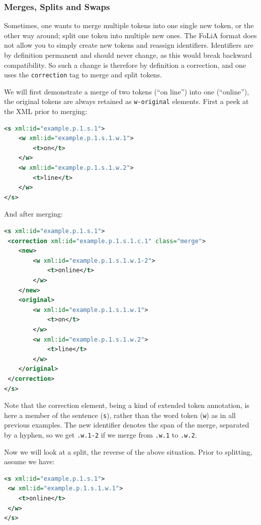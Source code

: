 \documentclass[a4paper,12pt]{report}
\begin{document}
\subsubsection{Merges, Splits and Swaps} 

Sometimes, one wants to merge multiple tokens into one single new token, or the other way around; split one token into multiple new ones. The FoLiA format does not allow you to simply create new tokens and reassign identifiers. Identifiers are by definition permanent and should never change, as this would break backward compatibility. So such a change is therefore by definition a correction, and one uses the \texttt{correction} tag to merge and split tokens.

We will first demonstrate a merge of two tokens (``on line'') into one (``online''), the original tokens are always retained as \texttt{w-original} elements. First a peek at the XML prior to merging:

\begin{lstlisting}[language=xml]
<s xml:id="example.p.1.s.1">
    <w xml:id="example.p.1.s.1.w.1">
        <t>on</t>
    </w>
    <w xml:id="example.p.1.s.1.w.2">
        <t>line</t>
    </w>                       
</s>  
\end{lstlisting}

And after merging:

\begin{lstlisting}[language=xml]
<s xml:id="example.p.1.s.1">
 <correction xml:id="example.p.1.s.1.c.1" class="merge">
    <new>
        <w xml:id="example.p.1.s.1.w.1-2">        
            <t>online</t>
        </w>
    </new>
    <original>
        <w xml:id="example.p.1.s.1.w.1">
            <t>on</t>
        </w>
        <w xml:id="example.p.1.s.1.w.2">
            <t>line</t>
        </w>                         
    </original>
 </correction>               
</s>
\end{lstlisting} 

Note that the correction element, being a kind of extended token annotation, is here a member of the sentence (\texttt{s}), rather than the word token (\texttt{w}) as in all previous examples. The new identifier denotes the span of the merge, separated by a hyphen, so we get \texttt{.w.1-2} if we merge from \texttt{.w.1} to \texttt{.w.2}.

Now we will look at a split, the reverse of the above situation. Prior to splitting, assume we have:

\begin{lstlisting}[language=xml]
<s xml:id="example.p.1.s.1">
 <w xml:id="example.p.1.s.1.w.1">
    <t>online</t>
 </w>                         
</s>
\end{lstlisting}
\end{document}
